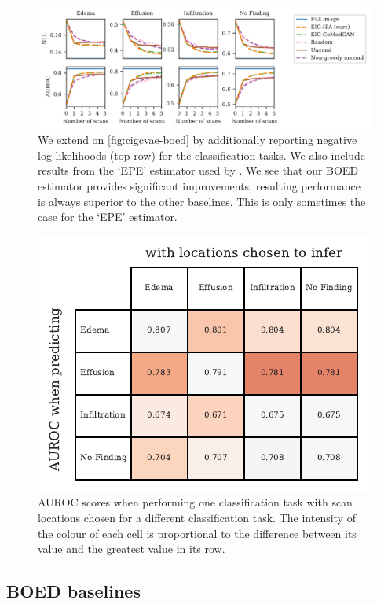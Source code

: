 \begin{figure}[t]
  \centering
  \includegraphics[width=\textwidth]{figs/cigcvae/boed-auroc-curve-supp}
  \caption{We extend on \cref{fig:cigcvae-boed} by additionally reporting negative
    log-likelihoods (top row) for the classification tasks. We also include
    results from the `EPE' estimator used by \citet{harvey2019near}. We see that
    our BOED estimator provides significant improvements; resulting performance
    is always superior to the other baselines. This is only sometimes the case
    for the `EPE' estimator. }
  \label{fig:cigcvae-boed-auroc-supp}
\end{figure}

\begin{figure}[t]
  \centering
  \includegraphics[scale=1]{figs/cigcvae/table-AUROC-boed}
  \caption{AUROC scores when performing one classification task with scan
    locations chosen for a different classification task. The intensity of the
    colour of each cell is proportional to the difference between its value and
    the greatest value in its row.}
  \label{fig:cigcvae-boed-correlations}
\end{figure}

\subsection{BOED baselines}
